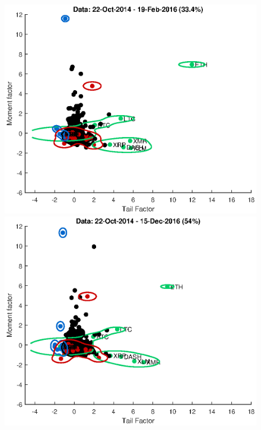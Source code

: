 \begin{figure}[H]
	\begin{minipage}[b]{0.55\textwidth}
	\centering
	\includegraphics[width=1\textwidth]{Fig/figure_10a}
	
\end{minipage}
\begin{minipage}[b]{0.55\textwidth}
	\centering
	\includegraphics[width=1\textwidth]{Fig/figure_10b}
	
\end{minipage}


\end{figure}
